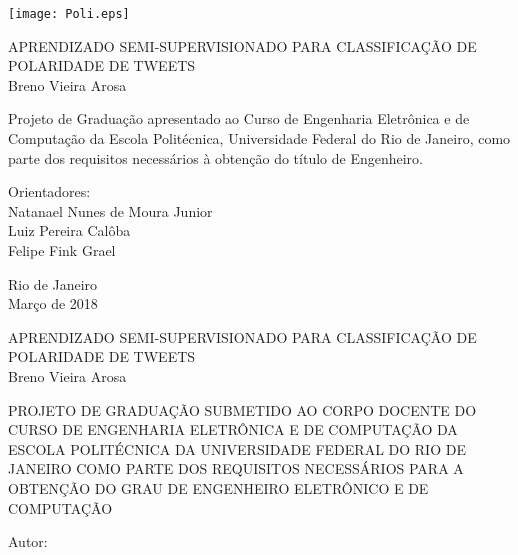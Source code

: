\texttt{[image: Poli.eps]}

\begin{center}
\large{APRENDIZADO SEMI-SUPERVISIONADO PARA CLASSIFICAÇÃO DE POLARIDADE DE TWEETS}\\
   \vspace{2cm}
\large{Breno Vieira Arosa}\\
\end{center}
   \vspace{3cm}
\hspace{7cm}
\hfill \parbox{8.0cm}{Projeto de Graduação apresentado ao Curso de Engenharia Eletrônica e de Computação da Escola Politécnica, Universidade Federal do Rio de Janeiro, como parte dos requisitos necessários à obtenção do título de Engenheiro.\\}
   \vspace{2cm}
\hfill \parbox{8.0cm}{Orientadores: \\
                      Natanael Nunes de Moura Junior\\
                      Luiz Pereira Calôba\\
                      Felipe Fink Grael}
\vfill
\begin{center}
Rio de Janeiro \\
Março de 2018
\end{center}

\pagebreak

\begin{center}
\large{APRENDIZADO SEMI-SUPERVISIONADO PARA CLASSIFICAÇÃO DE POLARIDADE DE TWEETS}\\
   \vspace{1cm}
\large{Breno Vieira Arosa}\\
\end{center}
   \vspace{1cm}
PROJETO DE GRADUAÇÃO SUBMETIDO AO CORPO DOCENTE DO CURSO DE ENGENHARIA ELETRÔNICA E DE COMPUTAÇÃO DA ESCOLA POLITÉCNICA DA UNIVERSIDADE FEDERAL DO RIO DE JANEIRO COMO PARTE DOS REQUISITOS NECESSÁRIOS PARA A OBTENÇÃO DO GRAU DE ENGENHEIRO ELETRÔNICO E DE COMPUTAÇÃO

   \vspace{1cm}
Autor:
      \vspace{0.3cm}
      \begin{flushright}
         \parbox{10cm}{
            \hrulefill

            \vspace{-.375cm}

            \vspace{0.1cm}
         }
      \end{flushright}


